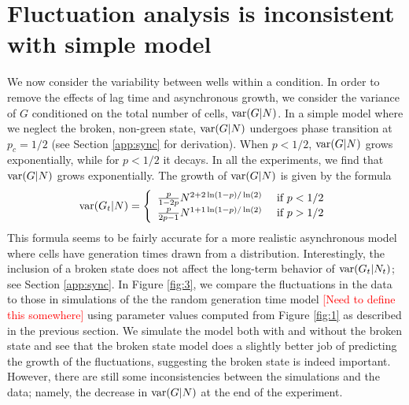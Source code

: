 \documentclass{article}
\begin{document}
\section{Fluctuation analysis is inconsistent with simple model}
We now consider the variability between wells within a condition. In order to remove the effects of lag time and asynchronous  growth, we consider the variance  of $G$ conditioned on the total number of cells, ${\rm var}(G|N)$. In a simple model where we neglect the broken, non-green state, ${\rm var}(G|N)$ undergoes phase transition at $p_c = 1/2$ (see Section \ref{app:sync} for derivation). When $p<1/2$, ${\rm var}(G|N)$ grows exponentially, while for $p<1/2$ it decays. In all the experiments, we find that ${\rm var}(G|N)$ grows exponentially. The growth of ${\rm var}(G|N)$ is given by the formula 
\begin{equation}
{\rm var}(G_t|N) = \left\{\begin{array}{cc} 
\frac{p}{1-2p} N^{2 + 2 \ln(1-p)/\ln(2)}& \text{ if } p<1/2\\
\frac{p}{2p-1} N^{1+ 1 \ln(1-p)/\ln(2)}& \text{ if } p>1/2
\end{array}\right.
\end{equation}
This formula seems to be fairly accurate for a more realistic asynchronous model where cells have generation times drawn from a distribution.  Interestingly, the inclusion of a broken state does not affect the long-term behavior of ${\rm var}(G_t|N_t)$; see Section \ref{app:sync}. In Figure \ref{fig:3}, we compare the fluctuations in the data to those in simulations of the the random generation time model  \textcolor{red}{[Need to define this somewhere]} using parameter values computed from Figure \ref{fig:1} as described in the previous section. We simulate the model both with and without the broken state and see that the broken state model does a slightly better job of predicting the growth of the fluctuations, suggesting the broken state is indeed important. However, there are still some inconsistencies between the simulations and the data; namely, the decrease in ${\rm var}(G|N)$ at the end of the experiment.  
\end{document}
